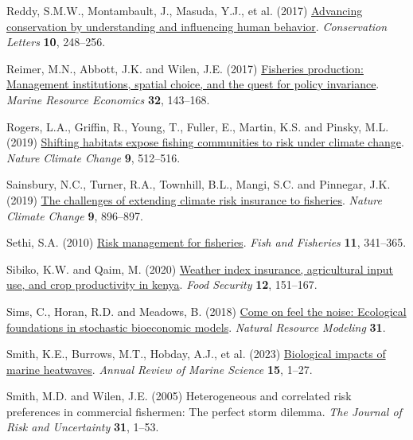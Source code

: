 \documentclass[
  letterpaper,
  DIV=11,
  numbers=noendperiod]{scrartcl}
\newlength{\cslhangindent}
\newlength{\cslentryspacingunit} %
\newenvironment{CSLReferences}[2] %
 {%
  \setlength{\parindent}{0pt}
  \ifodd #1
  \let\oldpar\par
  \def\par{\hangindent=\cslhangindent\oldpar}
  \fi
  \setlength{\parskip}{#2\cslentryspacingunit}
 }%
 {}
\theoremstyle{plain}
\theoremstyle{plain}
\theoremstyle{remark}
\begin{document}
\begin{CSLReferences}{1}{0}
\leavevmode{}%
Reddy, S.M.W., Montambault, J., Masuda, Y.J., et al. (2017)
\href{https://doi.org/10.1111/conl.12252}{Advancing conservation by
understanding and influencing human behavior}. \emph{Conservation
Letters} \textbf{10}, 248--256.

\leavevmode{}%
Reimer, M.N., Abbott, J.K. and Wilen, J.E. (2017)
\href{https://doi.org/10.1086/690678}{Fisheries production: Management
institutions, spatial choice, and the quest for policy invariance}.
\emph{Marine Resource Economics} \textbf{32}, 143--168.

\leavevmode{}%
Rogers, L.A., Griffin, R., Young, T., Fuller, E., Martin, K.S. and
Pinsky, M.L. (2019)
\href{https://doi.org/10.1038/s41558-019-0503-z}{Shifting habitats
expose fishing communities to risk under climate change}. \emph{Nature
Climate Change} \textbf{9}, 512--516.

\leavevmode{}%
Sainsbury, N.C., Turner, R.A., Townhill, B.L., Mangi, S.C. and Pinnegar,
J.K. (2019) \href{https://doi.org/10.1038/s41558-019-0645-z}{The
challenges of extending climate risk insurance to fisheries}.
\emph{Nature Climate Change} \textbf{9}, 896--897.

\leavevmode{}%
Sethi, S.A. (2010)
\href{https://doi.org/10.1111/j.1467-2979.2010.00363.x}{Risk management
for fisheries}. \emph{Fish and Fisheries} \textbf{11}, 341--365.

\leavevmode{}%
Sibiko, K.W. and Qaim, M. (2020)
\href{https://doi.org/10.1007/s12571-019-00987-y}{Weather index
insurance, agricultural input use, and crop productivity in kenya}.
\emph{Food Security} \textbf{12}, 151--167.

\leavevmode{}%
Sims, C., Horan, R.D. and Meadows, B. (2018)
\href{https://doi.org/10.1111/NRM.12191}{Come on feel the noise:
Ecological foundations in stochastic bioeconomic models}. \emph{Natural
Resource Modeling} \textbf{31}.

\leavevmode{}%
Smith, K.E., Burrows, M.T., Hobday, A.J., et al. (2023)
\href{https://doi.org/10.1146/annurev-marine-032122-121437}{Biological
impacts of marine heatwaves}. \emph{Annual Review of Marine Science}
\textbf{15}, 1--27.

\leavevmode{}%
Smith, M.D. and Wilen, J.E. (2005) Heterogeneous and correlated risk
preferences in commercial fishermen: The perfect storm dilemma.
\emph{The Journal of Risk and Uncertainty} \textbf{31}, 1--53.


\end{CSLReferences}
\end{document}
